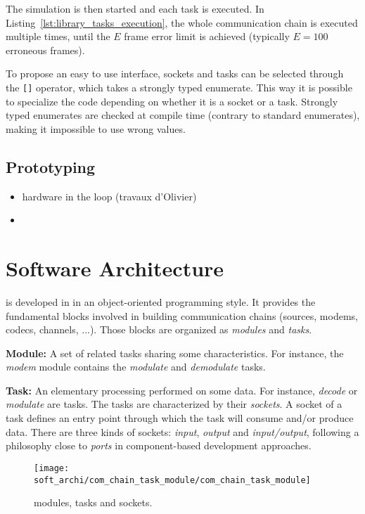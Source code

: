 The simulation is then started and each task is executed. In
Listing~\ref{lst:library_tasks_execution}, the whole communication chain is
executed multiple times, until the $E$ frame error limit is achieved (typically
$E = 100$ erroneous frames).

To propose an easy to use interface, sockets and tasks can be selected through
the \verb|[]| operator, which takes a \Cxx strongly typed enumerate. This way it
is possible to specialize the code depending on whether it is a socket or a
task. Strongly typed enumerates are checked at compile time (contrary to
standard enumerates), making it impossible to use wrong values.

\subsection{Prototyping}

\begin{itemize}
  \item hardware in the loop (travaux d'Olivier)
  \item \cite{Cassagne2017,Cassagne2017a}
\end{itemize}

\section{Software Architecture}
\label{sec:soft_archi}

\AFFECT is developed in \Cxx in an object-oriented programming style. It
provides the fundamental blocks involved in building communication chains
(sources, modems, codecs, channels, ...). Those blocks are organized as
\textit{modules} and \textit{tasks}.

\textbf{Module:} A set of related tasks sharing some characteristics. For
instance, the \textit{modem} module contains the \textit{modulate} and
\textit{demodulate} tasks.

\textbf{Task:} An elementary processing performed on some data. For instance,
\textit{decode} or \textit{modulate} are tasks. The tasks are characterized by
their \textit{sockets}. A socket of a task defines an entry point through which
the task will consume and/or produce data. There are three kinds of sockets:
\textit{input}, \textit{output} and \textit{input/output}, following a
philosophy close to \emph{ports} in component-based development approaches.

\begin{figure}[htp]
  \centering
  \texttt{[image: soft\_archi/com\_chain\_task\_module/com\_chain\_task\_module]}
  \caption{\AFFECT modules, tasks and sockets.}
  \label{fig:soft_archi_com_chain_task_module}
\end{figure}

